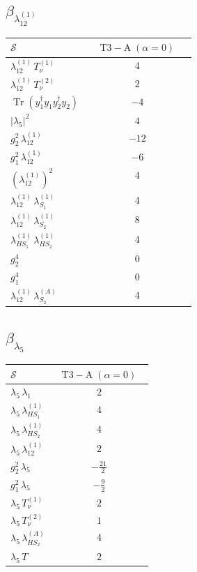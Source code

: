 \documentclass[9pt]{article}
\begin{document}
\subsection*{$ \beta_{\lambda_{12}^{(1)}} $}
\begin{longtable}{@{}p{0.31\linewidth}c@{}}
\toprule
$\mathcal{S}$ & $ \mathrm{T3-A}\;(\alpha=0) $ \\
\midrule
$ \lambda_{12}^{(1)}\,T_{\nu}^{(1)} $ & $ 4 $ \\
$ \lambda_{12}^{(1)}\,T_{\nu}^{(2)} $ & $ 2 $ \\
$ \operatorname{Tr}(y_1^\dagger y_1y_2^\dagger y_2) $ & $ -4 $ \\
$ |\lambda_5|^2 $ & $ 4 $ \\
$ g_2^2\,\lambda_{12}^{(1)} $ & $ -12 $ \\
$ g_1^2\,\lambda_{12}^{(1)} $ & $ -6 $ \\
$ \left(\lambda_{12}^{(1)}\right)^2 $ & $ 4 $ \\
$ \lambda_{12}^{(1)}\,\lambda_{S_1}^{(1)} $ & $ 4 $ \\
$ \lambda_{12}^{(1)}\,\lambda_{S_2}^{(1)} $ & $ 8 $ \\
$ \lambda_{HS_1}^{(1)}\,\lambda_{HS_2}^{(1)} $ & $ 4 $ \\
$ g_2^4 $ & $ 0 $ \\
$ g_1^4 $ & $ 0 $ \\
$ \lambda_{12}^{(1)}\,\lambda_{S_2}^{(A)} $ & $ 4 $ \\
\bottomrule
\end{longtable}
\subsection*{$ \beta_{\lambda_5} $}
\begin{longtable}{@{}p{0.31\linewidth}c@{}}
\toprule
$\mathcal{S}$ & $ \mathrm{T3-A}\;(\alpha=0) $ \\
\midrule
$ \lambda_5\,\lambda_1 $ & $ 2 $ \\
$ \lambda_5\,\lambda_{HS_1}^{(1)} $ & $ 4 $ \\
$ \lambda_5\,\lambda_{HS_2}^{(1)} $ & $ 4 $ \\
$ \lambda_5\,\lambda_{12}^{(1)} $ & $ 2 $ \\
$ g_2^2\,\lambda_5 $ & $ - \frac{21}{2} $ \\
$ g_1^2\,\lambda_5 $ & $ - \frac{9}{2} $ \\
$ \lambda_5\,T_{\nu}^{(1)} $ & $ 2 $ \\
$ \lambda_5\,T_{\nu}^{(2)} $ & $ 1 $ \\
$ \lambda_5\,\lambda_{HS_2}^{(A)} $ & $ 4 $ \\
$ \lambda_5\,T $ & $ 2 $ \\
\bottomrule
\end{longtable}
\end{document}
